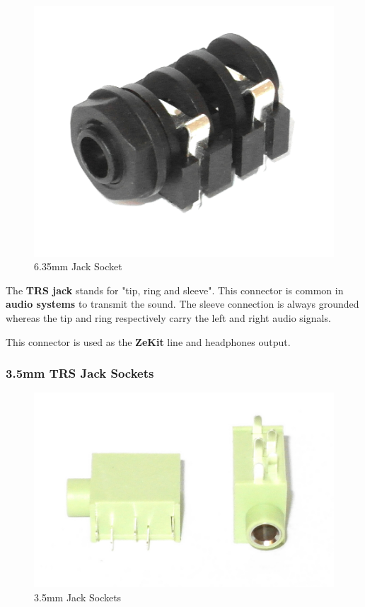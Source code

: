 \documentclass{scrartcl}
\begin{document}
\begin{figure}[!ht]
    \begin{center}
        \includegraphics[scale=0.20]{assets/zekit-jack.jpg}
        \caption{6.35mm Jack Socket}
    \end{center}
\end{figure}

The \textbf{TRS jack} stands for "tip, ring and sleeve". This connector is common in \textbf{audio systems} to transmit the sound. The sleeve connection is always grounded whereas the tip and ring respectively carry the left and right audio signals.

This connector is used as the \textbf{ZeKit} line and headphones output.

\pagebreak
\subsubsection{3.5mm TRS Jack Sockets}

\begin{figure}[!ht]
    \begin{center}
        \includegraphics[scale=0.15]{assets/zekit-minijack.jpg}
        \caption{3.5mm Jack Sockets}
    \end{center}
\end{figure}
\end{document}
